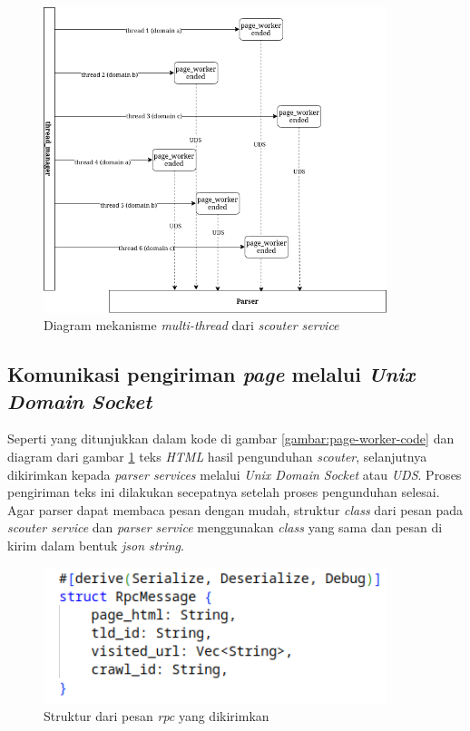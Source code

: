 \begin{figure}[H]
  \centering
  \includegraphics[keepaspectratio, width=10cm]{gambar/scouter-multithread-diagram.png}
  \caption{Diagram mekanisme \emph{multi-thread} dari \emph{scouter service}}
  \label{gambar:scouter-multithread-diagram}
\end{figure}

\subsection{Komunikasi pengiriman \emph{page} melalui \emph{Unix Domain Socket}} 

Seperti yang ditunjukkan dalam kode di gambar \ref{gambar:page-worker-code} dan diagram dari gambar \ref{gambar:scouter-multithread-diagram} teks \emph{HTML} hasil pengunduhan \emph{scouter}, selanjutnya dikirimkan kepada \emph{parser services} melalui \emph{Unix Domain Socket} atau \emph{UDS}. Proses pengiriman teks ini dilakukan secepatnya setelah proses pengunduhan selesai. Agar parser dapat membaca pesan dengan mudah, struktur \emph{class} dari pesan pada \emph{scouter service} dan \emph{parser service} menggunakan \emph{class} yang sama dan pesan di kirim dalam bentuk \emph{json string}.

\begin{figure}[H]
  \centering
  \includegraphics[keepaspectratio, width=10cm]{gambar/rpc-message-struct.png}
  \caption{Struktur dari pesan \emph{rpc} yang dikirimkan}
  \label{gambar:rpc-struct-scouter}
\end{figure}

